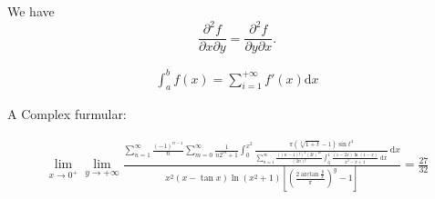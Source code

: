 \documentclass{article}
\begin{document}
We have
\[
	\frac{\partial^2 f}{\partial x \partial y}=\frac{\partial^2 f}{\partial y \partial x}.
\]

\begin{align}
	\int_{a}^{b}f(x) = \sum_{i=1}^{+\infty}{f'(x)}\mathrm{d}x
\end{align}


A Complex furmular: 

\begin{align*}
\lim _{x \rightarrow 0^{+}} \lim _{y \rightarrow+\infty} \frac{\displaystyle\sum_{n=1}^{\infty} \frac{(-1)^{n-1}}{n} \sum_{m=0}^{\infty} \frac{1}{n 2^{m}+1} \int_{0}^{x^{2}} \frac{\pi(\sqrt[4]{1+t}-1) \sin t^{4}}{\displaystyle\sum_{n=1}^{\infty} \frac{((n-1) !)^{2}(2 t)^{2 n}}{(2 n) !} \int_{0}^{1} \frac{(1-2 x) \ln (1-x)}{x^{2}-x+1} \mathrm{~d} x} \mathrm{~d} x}{x^{2}(x-\tan x) \ln \left(x^{2}+1\right)\left[\left(\frac{2 \arctan \frac{y}{x}}{\pi}\right)^{y}-1\right]}=\frac{27}{32}
\end{align*}
\end{document}
